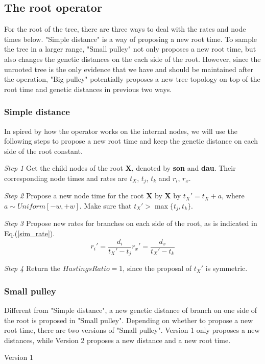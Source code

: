 \documentclass{bmcart}
\begin{document}
\subsection{The root operator}
For the root of the tree, there are three ways to deal with the rates and node times below. "Simple distance" is a way of proposing a new root time. To sample the tree in a larger range, "Small pulley" not only proposes a new root time, but also changes the genetic distances on the each side of the root. However, since the unrooted tree is the only evidence that we have and should be maintained after the operation, "Big pulley" potentially proposes a new tree topology on top of the root time and genetic distances in previous two ways.
\subsubsection{Simple distance}
In spired by how the operator works on the internal nodes, we will use the following steps to propose a new root time and keep the genetic distance on each side of the root constant.

\emph{Step 1} Get the child nodes of the root \textbf{X}, denoted by \textbf{son} and \textbf{dau}. Their corresponding node times and rates are $t_X$, $t_j$, $t_k$ and $r_i$, $r_x$.

\emph{Step 2} Propose a new node time for the root \textbf{X} by \textbf{X} by ${t_X}' = {t_X} + a$, where $a \sim Uniform[ - w, + w]$. Make sure that ${t_X}' > \max \{ {t_j},{t_k}\} $.

\emph{Step 3} Propose new rates for branches on each side of the root, as is indicated in Eq.(\ref{sim_rate}).
\begin{subequations}\label{sim_rate}
  \begin{equation}
{r_i}' = \frac{{{d_i}}}{{{t_X}' - {t_j}}}
  \end{equation}
  \begin{equation}
{r_x}' = \frac{{{d_x}}}{{{t_X}' - {t_k}}}
  \end{equation}
\end{subequations}

\emph{Step 4} Return the $HastingsRatio = 1$, since the proposal of  ${t_X}'$ is symmetric.
\subsubsection{Small pulley}
Different from "Simple distance", a new genetic distance of branch on one side of the root is proposed in "Small pulley". Depending on whether to propose a new root time, there are two versions of "Small pulley". Version 1 only proposes a new distances, while Version 2 proposes a new distance and a new root time.
\begin{description}
\item[Version 1]
\end{description}
\end{document}
